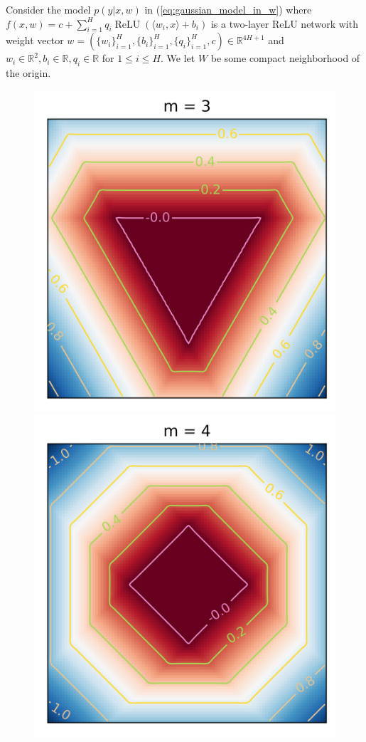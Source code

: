 \documentclass[11pt]{article}
\numberwithin{equation}{section}
\theoremstyle{plain}
\theoremstyle{definition}
\begin{document}
Consider the model $p(y|x,w)$ in (\ref{eq:gaussian_model_in_w}) where
$
f(x,w) = c + \sum_{i=1}^H q_i \operatorname{ReLU}( \langle w_i, x \rangle + b_i )
$
is a two-layer ReLU network with weight vector $w = (\{w_i\}_{i=1}^H, \{b_i\}_{i=1}^H, \{q_i\}_{i=1}^H, c) \in \mathbb{R}^{4H+1}$ and $w_i \in \mathbb{R}^2, b_i \in \mathbb{R}, q_i \in \mathbb{R}$ for $1 \le i \le H$. We let $W$ be some compact neighborhood of the origin.

\begin{figure}[h]
	\begin{center}
		\includegraphics[scale=0.5]{truedist3.png}
		\includegraphics[scale=0.5]{truedist4.png}

\end{center}
\end{figure}
\end{document}
